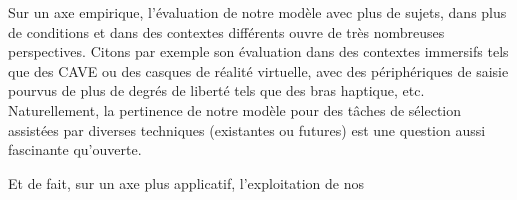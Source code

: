 	Sur un axe empirique, l'évaluation de notre modèle avec plus de sujets, dans plus de conditions et dans des contextes différents ouvre de très nombreuses perspectives. Citons par exemple son évaluation dans des contextes immersifs tels que des CAVE ou des casques de réalité virtuelle, avec des périphériques de saisie pourvus de plus de degrés de liberté tels que des bras haptique, etc. Naturellement, la pertinence de notre modèle pour des tâches de sélection assistées par diverses techniques (existantes ou futures) est une question aussi fascinante qu'ouverte.
	
	Et de fait, sur un axe plus applicatif, l'exploitation de nos 
	
	